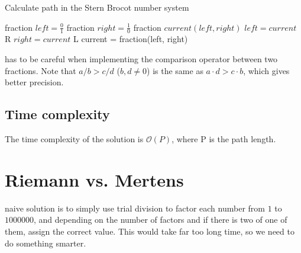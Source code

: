 \documentclass[11pt,a4paper,twoside]{article}
\begin{document}
\begin{algorithm}
    \caption{Calculate path in the Stern Brocot number system}
    \label{lst:sternbrocot}
    \begin{algorithmic}
        \STATE fraction $left = \frac{0}{1}$
        \STATE fraction $right = \frac{1}{0}$
        \STATE fraction $current(left, right)$ 
                \STATE $left = current$
                \PRINT R
            \ELSE
                \STATE $right = current$
                \PRINT L
            \ENDIF
            \STATE current = fraction(left, right) 
        \ENDWHILE
    \end{algorithmic}
\end{algorithm}

 has to be careful when implementing the comparison operator
between two fractions.  Note that $a/b > c/d$ ($b,d \neq 0$) is the same as $a
\cdot d > c \cdot b$, which gives better precision.

\subsection{Time complexity}
The time complexity of the solution is $\mathcal{O}(P)$, where P is the path
length.


\section{Riemann vs. Mertens}

 naive solution is to simply use trial division to factor each
number from $1$ to $1000000$, and depending on the number of factors and if
there is two of one of them, assign the correct value. This would take far too
long time, so we need to do something smarter.
\end{document}
